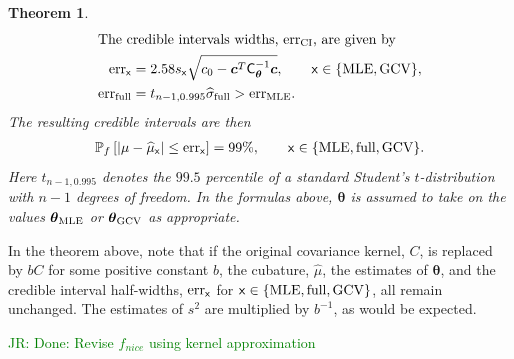 \documentclass{iitthesis}          %
\newcommand{\bm}[1]{\boldsymbol{#1}}
\newcommand{\vtheta}{{\bm{\theta}}}
\newcommand{\vc}{\bm{c}}
\newcommand{\mCthetaInv}{{\mathsf{C}^{-1}_{\vtheta}}}
\newcommand{\hmu}{\widehat{\mu}}
\newcommand{\hsigma}{\widehat{\sigma}}
\newcommand{\MLE}{\textup{MLE}}
\newcommand{\full}{\textup{full}}
\newcommand{\GCV}{\textup{GCV}}
\newcommand{\err}{\textup{err}}
\newcommand{\JRNote}[1]{{\textcolor{green}{JR: #1}}}
\newtheorem{theorem}{Theorem}[section]
\begin{document}
\begin{theorem}
\begin{align}
	\intertext{The credible intervals widths, $\err_{\textup{CI}}$, are given by}
	\label{eqn:err_MLEGCV}
	\err_{\mathsf{x}} & = 2.58 s_{\mathsf{x}} \sqrt{c_{0} - \vc^T\mCthetaInv\vc }, \qquad \mathsf{x} \in \{\MLE, \GCV\},  \\ 
	\err_{\textup{full}} 
	& = t_{n-1,0.995} \hsigma_{\textup{full}} > \err_\MLE. \label{FJH:eq:errFull}
	\end{align}
	The resulting credible intervals are then
	\begin{align}
	\label{eqn_prob_CI}
	\mathbb{P}_f \left[
	|\mu-\hmu_{\mathsf{x}}| \leq \err_{\mathsf{x}} \right]  = 99\%, \qquad \mathsf{x} \in \{\MLE, \full, \GCV\}.
	\end{align}
	Here $t_{n-1,0.995}$ denotes the $99.5$ percentile of a standard Student's $t$-distribution with $n-1$ degrees of freedom.  In the formulas above, $\vtheta$ is assumed to take on the values $\vtheta_{\MLE}$ or $\vtheta_{\GCV}$ as appropriate.
\end{theorem}

In the theorem above, note that if the original covariance kernel, $C$, is replaced by $b C$ for some positive constant $b$, the cubature, $\hmu$, the estimates of $\vtheta$, and the credible interval half-widths, $\err_{\mathsf{x}}$ for $\mathsf{x} \in \{\MLE, \full, \GCV\}$, all remain unchanged.  The estimates of $s^2$ are multiplied by $b^{-1}$, as would be expected. 




\label{sec:cone_of_functions}

\JRNote{Done: Revise $f_{nice}$ using kernel approximation}
\end{document}
